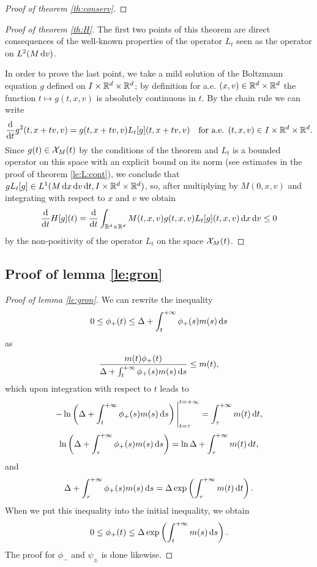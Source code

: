 \begin{subappendices}
\begin{proof}[Proof of theorem \ref{th:conserv}]
\end{proof}
\begin{proof}[Proof of theorem \ref{th:H}]
The first two points of this theorem are direct consequences of the well-known properties of the operator $L_t$ seen as the operator on $L^2(M{\,\mathrm{d} v})$.

In order to prove the last point, we take a mild solution of the Boltzmann equation  $g$ defined on $I\times{{\mathbb R^d}\times{\mathbb R^d}}$; by definition for a.e. $(x,v) \in {{\mathbb R^d}\times{\mathbb R^d}}$ the function $t\mapsto g(t,x,v)$ is absolutely continuous in $t$. By the chain rule we can write
	\[\frac{\mathrm d}{\mathrm dt} g^2(t,x+tv,v) = g(t,x+tv,v)L_t[g](t,x+tv,v)\quad \mbox{for a.e. } (t,x,v)\in I\times{{\mathbb R^d}\times{\mathbb R^d}}.\]
	Since $g(t)\in {\mathcal X_M(t)}$ by the conditions of the theorem and  $L_t$ is a bounded operator on this space with an explicit bound on its norm (see estimates in the proof of theorem \ref{le:L:cont}), we conclude that  $gL_t[g]\in L^1(M{\,\mathrm{d} x}{\,\mathrm{d} v}{\,\mathrm dt},I\times{{\mathbb R^d}\times{\mathbb R^d}})$, so, after multiplying by $M(0,x,v)$ and integrating with respect to $x$ and $v$ we obtain 
	\[\frac{\mathrm d}{\mathrm dt}H[g](t)=\frac{\mathrm d}{\mathrm dt}\int_{{{\mathbb R^d}\times{\mathbb R^d}}}M(t,x,v)g(t,x,v)L_t[g](t,x,v){\,\mathrm{d} x}{\,\mathrm{d} v}\le 0\]
	by the non-positivity of the operator $L_t$ on the space ${\mathcal X_M(t)}$.
\end{proof}


	\subsection{Proof of lemma \ref{le:gron}} %
	\label{sec:proof_of_lemma_GRON}
	\begin{proof}[Proof of lemma \ref{le:gron}] 
		We can rewrite the inequality 
		\[0\le \phi_+(t)\le \Delta+\int_{t}^{+\infty}\phi_+(s)m(s){\,\mathrm ds} \]
		as 
		\[\frac{m(t)\phi_+(t)}{\Delta+\int_{t}^{+\infty}\phi_+(s)m(s){\,\mathrm ds} }\le m(t),\]
		which upon integration with respect to $t$ leads to
		\[-\ln\left(\Delta +\int_{t}^{+\infty}\phi_+(s)m(s){\,\mathrm ds} \right)\Bigg|_{t=\tau}^{t=+\infty} = \int_{\tau}^{+\infty}m(t){\,\mathrm dt},\]
		\[\ln\left(\Delta +\int_{\tau}^{+\infty}\phi_+(s)m(s){\,\mathrm ds} \right) = \ln\Delta+\int_{\tau}^{+\infty}m(t){\,\mathrm dt},\]and
		\[ \Delta +\int_{\tau}^{+\infty}\phi_+(s)m(s){\,\mathrm ds}   =  \Delta\exp\left(\int_{\tau}^{+\infty}m(t){\,\mathrm dt}\right).\]
		When we put this inequality into the initial inequality, we obtain
		\[0\le \phi_+(t)\le \Delta\exp\left(\int_{t}^{+\infty}m(s){\,\mathrm ds}\right).\]
		The proof for $\phi_-$ and $\psi_\pm$ is done likewise.
	\end{proof}


\end{subappendices}